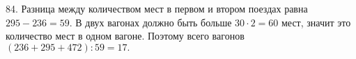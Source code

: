 84. Разница между количеством мест в первом и втором поездах равна $295-236=59.$ В двух вагонах должно быть больше $30\cdot2=60$ мест, значит это количество мест в одном вагоне. Поэтому всего вагонов $(236+295+472):59=17.$\\
